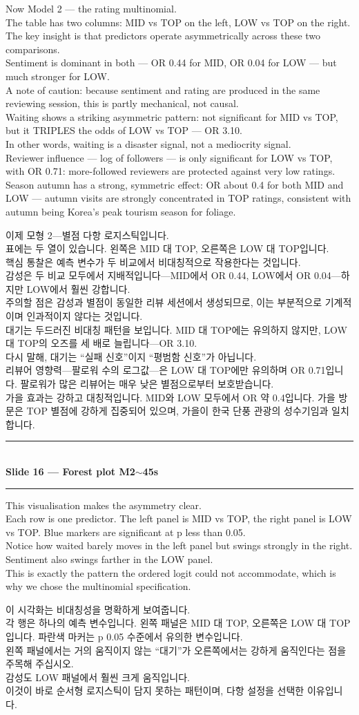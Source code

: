 \documentclass[10pt,a4paper]{article}
\newcommand{\sechead}[2]{%
  \vspace{6pt}%
  \noindent\rule{\linewidth}{0.6pt}\\[1pt]
  {\small\bfseries #1\hfill #2}\\[-3pt]
  \rule{\linewidth}{0.4pt}\par\vspace{2pt}%
}
\newcommand{\sent}[1]{#1\\[5pt]}
\newcommand{\bilingual}[2]{%
  \noindent%
  \begin{minipage}[t]{0.485\linewidth}
    \small #1
  \end{minipage}\hfill\vrule\hfill%
  \begin{minipage}[t]{0.483\linewidth}
    \small #2
  \end{minipage}\par\vspace{4pt}%
}
\begin{document}
\bilingual{%
\sent{Now Model 2 --- the rating multinomial.}
\sent{The table has two columns: MID vs TOP on the left, LOW vs TOP on
the right.}
\sent{The key insight is that predictors operate asymmetrically across
these two comparisons.}
\sent{Sentiment is dominant in both --- OR 0.44 for MID, OR 0.04 for
LOW --- but much stronger for LOW.}
\sent{A note of caution: because sentiment and rating are produced in
the same reviewing session, this is partly mechanical, not causal.}
\sent{Waiting shows a striking asymmetric pattern: not significant for
MID vs TOP, but it TRIPLES the odds of LOW vs TOP --- OR 3.10.}
\sent{In other words, waiting is a disaster signal, not a mediocrity
signal.}
\sent{Reviewer influence --- log of followers --- is only significant
for LOW vs TOP, with OR 0.71: more-followed reviewers are protected
against very low ratings.}
\sent{Season autumn has a strong, symmetric effect: OR about 0.4 for
both MID and LOW --- autumn visits are strongly concentrated in TOP
ratings, consistent with autumn being Korea's peak tourism season for
foliage.}
}{%
\sent{이제 모형 2---별점 다항 로지스틱입니다.}
\sent{표에는 두 열이 있습니다. 왼쪽은 MID 대 TOP, 오른쪽은 LOW 대
TOP입니다.}
\sent{핵심 통찰은 예측 변수가 두 비교에서 비대칭적으로 작용한다는
것입니다.}
\sent{감성은 두 비교 모두에서 지배적입니다---MID에서 OR 0.44, LOW에서
OR 0.04---하지만 LOW에서 훨씬 강합니다.}
\sent{주의할 점은 감성과 별점이 동일한 리뷰 세션에서 생성되므로, 이는
부분적으로 기계적이며 인과적이지 않다는 것입니다.}
\sent{대기는 두드러진 비대칭 패턴을 보입니다. MID 대 TOP에는 유의하지
않지만, LOW 대 TOP의 오즈를 세 배로 늘립니다---OR 3.10.}
\sent{다시 말해, 대기는 ``실패 신호''이지 ``평범함 신호''가 아닙니다.}
\sent{리뷰어 영향력---팔로워 수의 로그값---은 LOW 대 TOP에만 유의하며
OR 0.71입니다. 팔로워가 많은 리뷰어는 매우 낮은 별점으로부터
보호받습니다.}
\sent{가을 효과는 강하고 대칭적입니다. MID와 LOW 모두에서 OR 약
0.4입니다. 가을 방문은 TOP 별점에 강하게 집중되어 있으며, 가을이 한국
단풍 관광의 성수기임과 일치합니다.}
}

\sechead{Slide 16 --- Forest plot M2}{$\sim$45s}

\bilingual{%
\sent{This visualisation makes the asymmetry clear.}
\sent{Each row is one predictor. The left panel is MID vs TOP, the
right panel is LOW vs TOP. Blue markers are significant at p less than
0.05.}
\sent{Notice how waited barely moves in the left panel but swings
strongly in the right.}
\sent{Sentiment also swings farther in the LOW panel.}
\sent{This is exactly the pattern the ordered logit could not accommodate,
which is why we chose the multinomial specification.}
}{%
\sent{이 시각화는 비대칭성을 명확하게 보여줍니다.}
\sent{각 행은 하나의 예측 변수입니다. 왼쪽 패널은 MID 대 TOP, 오른쪽은
LOW 대 TOP입니다. 파란색 마커는 p 0.05 수준에서 유의한 변수입니다.}
\sent{왼쪽 패널에서는 거의 움직이지 않는 ``대기''가 오른쪽에서는 강하게
움직인다는 점을 주목해 주십시오.}
\sent{감성도 LOW 패널에서 훨씬 크게 움직입니다.}
\sent{이것이 바로 순서형 로지스틱이 담지 못하는 패턴이며, 다항 설정을
선택한 이유입니다.}
}
\end{document}
